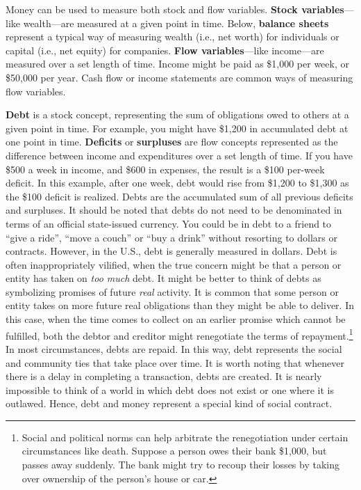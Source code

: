 \documentclass[
]{book}
\begin{document}
Money can be used to measure both stock and flow variables. \textbf{Stock variables}---like wealth---are measured at a given point in time. Below, \textbf{balance sheets} represent a typical way of measuring wealth (i.e., net worth) for individuals or capital (i.e., net equity) for companies. \textbf{Flow variables}---like income---are measured over a set length of time. Income might be paid as \$1,000 per week, or \$50,000 per year. Cash flow or income statements are common ways of measuring flow variables.

\textbf{Debt} is a stock concept, representing the sum of obligations owed to others at a given point in time. For example, you might have \$1,200 in accumulated debt at one point in time. \textbf{Deficits} or \textbf{surpluses} are flow concepts represented as the difference between income and expenditures over a set length of time. If you have \$500 a week in income, and \$600 in expenses, the result is a \$100 per-week deficit. In this example, after one week, debt would rise from \$1,200 to \$1,300 as the \$100 deficit is realized. Debts are the accumulated sum of all previous deficits and surpluses. It should be noted that debts do not need to be denominated in terms of an official state-issued currency. You could be in debt to a friend to ``give a ride'', ``move a couch'' or ``buy a drink'' without resorting to dollars or contracts. However, in the U.S., debt is generally measured in dollars. Debt is often inappropriately vilified, when the true concern might be that a person or entity has taken on \emph{too much} debt. It might be better to think of debts as symbolizing promises of future \emph{real} activity. It is common that some person or entity takes on more future real obligations than they might be able to deliver. In this case, when the time comes to collect on an earlier promise which cannot be fulfilled, both the debtor and creditor might renegotiate the terms of repayment.\footnote{Social and political norms can help arbitrate the renegotiation under certain circumstances like death. Suppose a person owes their bank \$1,000, but passes away suddenly. The bank might try to recoup their losses by taking over ownership of the person's house or car.} In most circumstances, debts are repaid. In this way, debt represents the social and community ties that take place over time. It is worth noting that whenever there is a delay in completing a transaction, debts are created. It is nearly impossible to think of a world in which debt does not exist or one where it is outlawed. Hence, debt and money represent a special kind of social contract.
\end{document}
